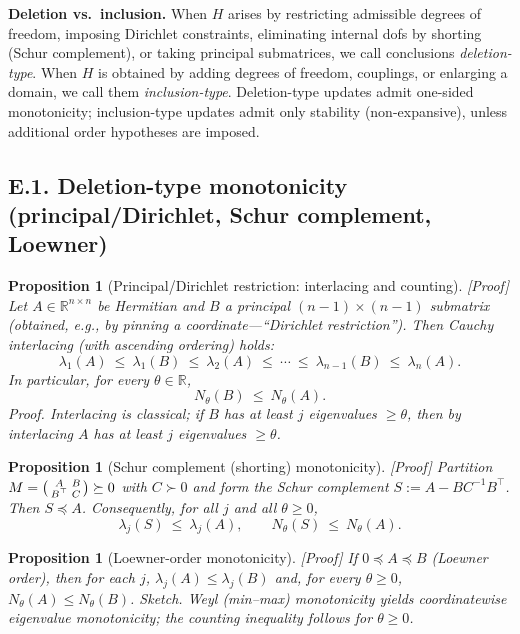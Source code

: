 \documentclass[11pt]{article}
\numberwithin{equation}{section}
\newtheorem{proposition}[theorem]{Proposition}
\theoremstyle{definition}
\begin{document}
\medskip
\noindent\textbf{Deletion vs.\ inclusion.}
When \(H\) arises by restricting admissible degrees of freedom, imposing Dirichlet constraints, eliminating internal dofs by shorting (Schur complement), or taking principal submatrices, we call conclusions \emph{deletion-type}.
When \(H\) is obtained by adding degrees of freedom, couplings, or enlarging a domain, we call them \emph{inclusion-type}.
Deletion-type updates admit one-sided monotonicity; inclusion-type updates admit only stability (non-expansive), unless additional order hypotheses are imposed.

\subsection*{E.1. Deletion-type monotonicity (principal/Dirichlet, Schur complement, Loewner)}

\begin{proposition}[Principal/Dirichlet restriction: interlacing and counting]\label{E:prop:dirichlet}
\textup{[Proof]}
Let \(A\in\mathbb{R}^{n\times n}\) be Hermitian and \(B\) a principal \((n-1)\times(n-1)\) submatrix (obtained, e.g., by pinning a coordinate—``Dirichlet restriction'').
Then Cauchy interlacing (with ascending ordering) holds:
\[
\lambda_1(A)\ \le\ \lambda_1(B)\ \le\ \lambda_2(A)\ \le\ \cdots\ \le\ \lambda_{n-1}(B)\ \le\ \lambda_n(A).
\]
In particular, for every \(\theta\in\mathbb{R}\),
\[
N_\theta(B)\ \le\ N_\theta(A).
\]
\emph{Proof.} Interlacing is classical; if \(B\) has at least \(j\) eigenvalues \(\ge\theta\), then by interlacing \(A\) has at least \(j\) eigenvalues \(\ge\theta\).
\end{proposition}

\begin{proposition}[Schur complement (shorting) monotonicity]\label{E:prop:schur}
\textup{[Proof]}
Partition \(M=\begin{psmallmatrix}A & B\\ B^\top & C\end{psmallmatrix}\succeq 0\) with \(C\succ 0\) and form the Schur complement \(S:=A-BC^{-1}B^\top\).
Then \(S\preceq A\).
Consequently, for all \(j\) and all \(\theta\ge 0\),
\[
\lambda_j(S)\ \le\ \lambda_j(A),\qquad N_\theta(S)\ \le\ N_\theta(A).
\]
\end{proposition}

\begin{proposition}[Loewner-order monotonicity]\label{E:prop:loewner}
\textup{[Proof]}
If \(0\preceq A\preceq B\) (Loewner order), then for each \(j\),
\(\lambda_j(A)\le \lambda_j(B)\) and, for every \(\theta\ge 0\), \(N_\theta(A)\le N_\theta(B)\).
\emph{Sketch.}
Weyl (min–max) monotonicity yields coordinatewise eigenvalue monotonicity; the counting inequality follows for \(\theta\ge 0\).
\end{proposition}
\end{document}
